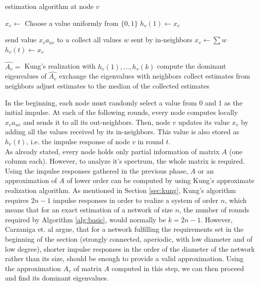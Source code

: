 \documentclass[a4paper,11pt,twoside]{report}
\begin{document}
\begin{algorithm}
\caption{estimation algorithm at node $v$}
\label{alg:basic}
\begin{algorithmic}[1]

\STATE $x_v \leftarrow$  Choose a value uniformly from $\{0,1\}$
\STATE $h_v(1) \leftarrow x_v$


\STATE send value $x_{v}a_{uv}$ to $u$
\STATE collect all values $w$ sent by in-neighbors
\STATE $x_v \leftarrow \sum{w}$
\STATE $h_v(t) \leftarrow x_v$

\ENDFOR

\ENDFOR
\STATE $\hat{A_v} = $ Kung's realization with $h_v(1),\dots, h_v(k)$
\STATE compute the dominant eigenvalues of $\hat{A_v}$
\STATE exchange the eigenvalues with neighbors
\STATE collect estimates from neighbors
\STATE adjust estimates to the median of the collected estimates

\end{algorithmic}
\end{algorithm}

In the beginning, each node must randomly select a value from 0 and 1 as the initial impulse. At each of the following rounds, every node computes locally $x_v a_{uv}$ and sends it to all its out-neighbors. Then, node $v$ updates its value $x_v$ by adding all the values received by its in-neighbors. This value is also stored as $h_v(t)$, i.e. the impulse response of node $v$ in round $t$.\\

As already stated, every node holds only partial information of matrix $A$ (one column each). However, to analyze it's spectrum, the whole matrix is required. Using the impulse responses gathered in the previous phase, $A$ or an approximation of $A$ of lower order can be computed by using Kung's approximate realization algorithm. As mentioned in Section \ref{sec:kung}, Kung's algorithm requires $2n-1$ impulse responses in order to realize a system of order $n$, which means that for an exact estimation of a network of size $n$, the number of rounds required by Algorithm \ref{alg:basic}, would normally be $k=2n-1$. However, Carzaniga et. al argue, that for a network fulfilling the requirements set in the beginning of the section (strongly connected, aperiodic, with low diameter and of low degree), shorter impulse responses in the order of the diameter of the network rather than its size, should be enough to provide a valid approximation. Using the approximation $A_v$ of matrix $A$ computed in this step, we can then proceed and find its dominant eigenvalues.\\
\end{document}
